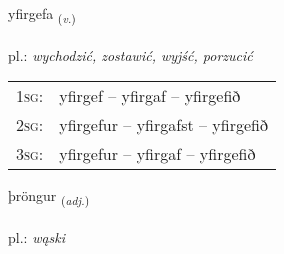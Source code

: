 \documentclass[frontgrid, backgrid]{flacards}\usepackage[]{graphicx}\usepackage[]{xcolor}
\begin{document}
\renewcommand{\flhead}{\vskip5pt \fboxsep=0pt {\small\bfseries\footnotesize Sagnorð | Verb}}
\renewcommand{\fcfoot}{\vskip5pt \fboxsep=0pt \hspace{2pt}{\small\bfseries\footnotesize 2K}}

\renewcommand{\blhead}{\vskip5pt {\small\bfseries\footnotesize Sagnorð | Verb }}
\renewcommand{\bcfoot}{\vskip5pt \hspace{2pt}{\small\bfseries\footnotesize 2K}}


{yfirgefa \small{\textsubscript{(\textit{v.})}} \\[1ex] %
\textphonetic{[ɪːvɪrcɛva]} \\
pl.: \emph{wychodzić, zostawić, wyjść, porzucić} \\  [2ex]
\renewcommand*{\arraystretch}{0.8}
\begin{tabular}{p{1cm}l}
\textsc{1sg}: & yfirgef -- yfirgaf -- yfirgefið \\ 
\textsc{2sg}: & yfirgefur -- yfirgafst -- yfirgefið \\ 
\textsc{3sg}: & yfirgefur -- yfirgaf -- yfirgefið \\ 
\end{tabular}
}

\renewcommand{\flhead}{\vskip5pt \fboxsep=0pt {\small\bfseries\footnotesize Lýsingarorð | Adjective}}
\renewcommand{\fcfoot}{\vskip5pt \fboxsep=0pt \hspace{2pt}{\small\bfseries\footnotesize 2K}}

\renewcommand{\blhead}{\vskip5pt {\small\bfseries\footnotesize Lýsingarorð | Adjective }}
\renewcommand{\bcfoot}{\vskip5pt \hspace{2pt}{\small\bfseries\footnotesize 2K}}


{þröngur \small{\textsubscript{(\textit{adj.})}} \\[1ex] %
\textphonetic{[θrœiŋkʏr]} \\
pl.: \emph{wąski} \\  [2ex]
\renewcommand*{\arraystretch}{0.8}
}
\end{document}
